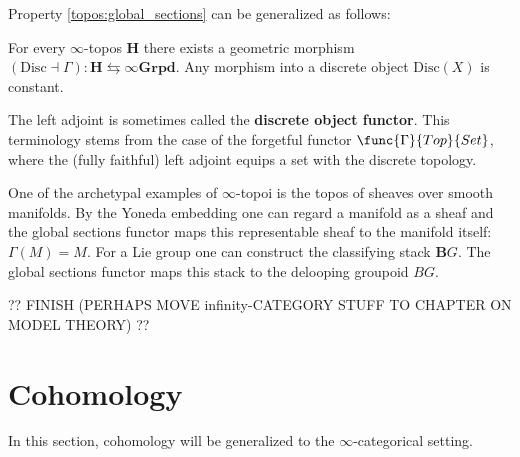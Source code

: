     Property \ref{topos:global_sections} can be generalized as follows:
    \begin{property}
        For every $\infty$-topos $\mathbf{H}$ there exists a geometric morphism $(\mathrm{Disc}\dashv\Gamma):\mathbf{H}\leftrightarrows\infty\mathbf{Grpd}$. Any morphism into a discrete object $\mathrm{Disc}(X)$ is constant.

        The left adjoint is sometimes called the \textbf{discrete object functor}. This terminology stems from the case of the forgetful functor $\func{\Gamma}{Top}{Set}$, where the (fully faithful) left adjoint equips a set with the discrete topology.
    \end{property}
    \begin{example}
        One of the archetypal examples of $\infty$-topoi is the topos of sheaves over smooth manifolds. By the Yoneda embedding one can regard a manifold as a sheaf and the global sections functor maps this representable sheaf to the manifold itself: $\Gamma(M)=M$. For a Lie group one can construct the classifying stack $\mathbf{B}G$. The global sections functor maps this stack to the delooping groupoid $BG$.
    \end{example}


    ?? FINISH (PERHAPS MOVE infinity-CATEGORY STUFF TO CHAPTER ON MODEL THEORY) ??

\section{Cohomology}

    In this section, cohomology will be generalized to the $\infty$-categorical setting.

